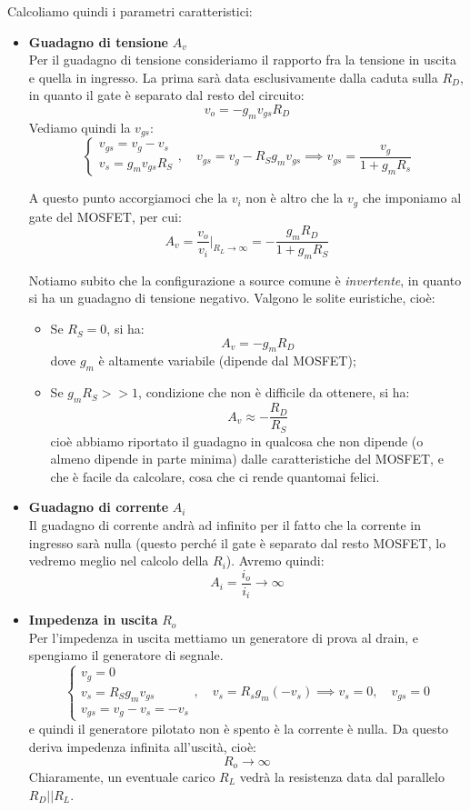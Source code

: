 \documentclass[a4paper,11pt]{article}
\begin{document}
Calcoliamo quindi i parametri caratteristici:
\begin{itemize}
\item \textbf{\textsf{Guadagno di tensione}} $A_v$ \\
Per il guadagno di tensione consideriamo il rapporto fra la tensione in uscita e quella in ingresso. La prima sarà data esclusivamente dalla caduta sulla $R_D$, in quanto il gate è separato dal resto del circuito:
$$
v_o = - g_m v_{gs} R_D
$$
Vediamo quindi la $v_{gs}$:
$$
\begin{cases}
v_{gs} = v_g - v_s \\
v_s = g_m v_{gs} R_S
\end{cases}, \quad
v_{gs} = v_g - R_S g_m v_{gs} \implies
v_{gs} = \frac{v_g}{1 + g_m R_s}
$$

A questo punto accorgiamoci che la $v_i$ non è altro che la $v_g$ che imponiamo al gate del MOSFET, per cui:
$$
A_v = \frac{v_o}{v_i} \Big|_{R_L \rightarrow \infty} = -\frac{g_m R_D}{1 + g_m R_S}
$$

Notiamo subito che la configurazione a source comune è \textit{invertente}, in quanto si ha un guadagno di tensione negativo. Valgono le solite euristiche, cioè:
\begin{itemize}
\item Se $R_S = 0$, si ha:
$$
A_v = - g_m R_D
$$
dove $g_m$ è altamente variabile (dipende dal MOSFET);
\item Se $g_m R_S >> 1$, condizione che non è difficile da ottenere, si ha:
$$
A_v \approx -\frac{R_D}{R_S}
$$
cioè abbiamo riportato il guadagno in qualcosa che non dipende (o almeno dipende in parte minima) dalle caratteristiche del MOSFET, e che è facile da calcolare, cosa che ci rende quantomai felici.
\end{itemize}

\item \textbf{\textsf{Guadagno di corrente}} $A_i$ \\
Il guadagno di corrente andrà ad infinito per il fatto che la corrente in ingresso sarà nulla (questo perché il gate è separato dal resto MOSFET, lo vedremo meglio nel calcolo della $R_i$). Avremo quindi:
$$
A_i = \frac{i_o}{i_i} \rightarrow \infty
$$

\item \textbf{\textsf{Impedenza in uscita}} $R_o$ \\
Per l'impedenza in uscita mettiamo un generatore di prova al drain, e spengiamo il generatore di segnale.
$$
\begin{cases}
v_g = 0 \\
v_s = R_S g_m v_{gs} \\
v_{gs} = v_g - v_s = - v_s
\end{cases}, \quad
v_s = R_s g_m (- v_s) \implies v_s = 0, \quad v_{gs} = 0
$$
e quindi il generatore pilotato non è spento è la corrente è nulla. Da questo deriva impedenza infinita all'uscità, cioè:
$$
R_o \rightarrow \infty
$$
Chiaramente, un eventuale carico $R_L$ vedrà la resistenza data dal parallelo $R_D || R_L$. 


\end{itemize}
\end{document}
